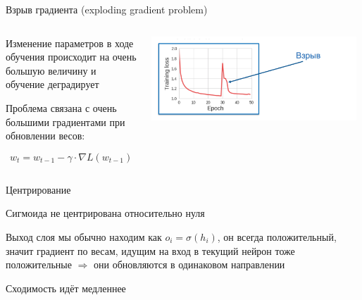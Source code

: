 \documentclass[notes,12pt, aspectratio=169]{beamer}
\newenvironment{wideitemize}{\itemize\addtolength{\itemsep}{10pt}}{\enditemize}
\begin{document}
\begin{frame}{Взрыв градиента (exploding gradient problem)}

\begin{columns}
	\begin{column}{0.4\textwidth}
		\begin{wideitemize}
			\item  Изменение параметров в ходе обучения происходит на очень большую величину и обучение деградирует
			
			\item Проблема связана с очень большими градиентами при обновлении весов:
			
			$$
			w_t = w_{t-1} - \gamma \cdot \nabla L(w_{t-1})
			$$
			
		\end{wideitemize}
	\end{column}
	\hfill
	\begin{column}{0.6\textwidth}
		
		\begin{center}
				\includegraphics[width=0.98\textwidth]{exp_grad.png} 
		\end{center} 
	\end{column}
\end{columns}
\end{frame}




\begin{frame}{Центрирование}
\begin{wideitemize}
	\item  Сигмоида не центрирована относительно нуля 
	
	\item  Выход слоя мы обычно находим как $o_i = \sigma(h_i)$, он всегда положительный, значит градиент по весам, идущим на вход в текущий нейрон тоже положительные $\Rightarrow$ они обновляются в одинаковом направлении 
	
	\item Сходимость идёт медленнее
\end{wideitemize} 
\end{frame}
\end{document}
